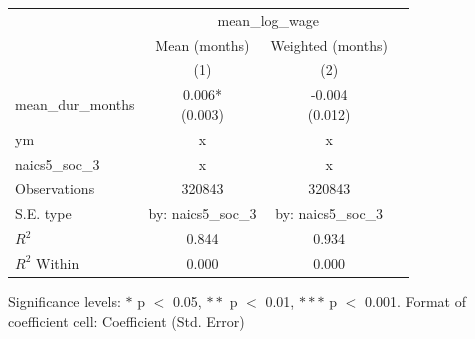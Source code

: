 \renewcommand\cellalign{t}
\begin{threeparttable}
\begin{tabular}{lccc}
\toprule
 & \multicolumn{2}{c}{mean_log_wage} \\
\cmidrule(lr){2-3} 
 & Mean (months) & Weighted (months) \\
 & (1) & (2) \\
\midrule
\addlinespace
mean_dur_months & \makecell{0.006* \\ (0.003)} & \makecell{-0.004 \\ (0.012)} \\
\midrule
\addlinespace
ym & x & x \\
naics5_soc_3 & x & x \\
\midrule
\addlinespace
Observations & 320843 & 320843 \\
S.E. type & by: naics5_soc_3 & by: naics5_soc_3 \\
$R^2$ & 0.844 & 0.934 \\
$R^2$ Within & 0.000 & 0.000 \\
\bottomrule
\end{tabular}
\footnotesize Significance levels: $*$ p $<$ 0.05, $**$ p $<$ 0.01, $***$ p $<$ 0.001. Format of coefficient cell: Coefficient 
 (Std. Error)
\end{threeparttable}